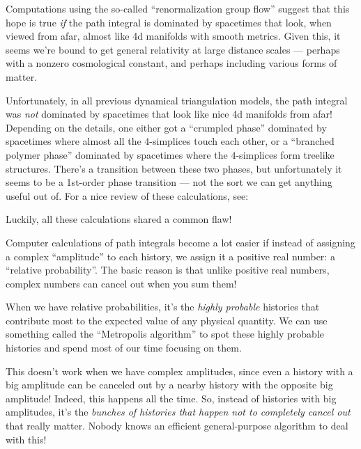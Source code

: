 \documentclass{article}
\def\tightlist{}
\renewcommand{\texttt}[1]{%
  \begingroup
  \ttfamily
  \begingroup\lccode`~=`/\lowercase{\endgroup\def~}{/\discretionary{}{}{}}%
  \begingroup\lccode`~=`[\lowercase{\endgroup\def~}{[\discretionary{}{}{}}%
  \begingroup\lccode`~=`.\lowercase{\endgroup\def~}{.\discretionary{}{}{}}%
  \catcode`/=\active\catcode`[=\active\catcode`.=\active
  \scantokens{#1\noexpand}%
  \endgroup
}
\begin{document}
Computations using the so-called ``renormalization group flow'' suggest
that this hope is true \emph{if} the path integral is dominated by
spacetimes that look, when viewed from afar, almost like 4d manifolds
with smooth metrics. Given this, it seems we're bound to get general
relativity at large distance scales --- perhaps with a nonzero
cosmological constant, and perhaps including various forms of matter.

Unfortunately, in all previous dynamical triangulation models, the path
integral was \emph{not} dominated by spacetimes that look like nice 4d
manifolds from afar! Depending on the details, one either got a
``crumpled phase'' dominated by spacetimes where almost all the
\(4\)-simplices touch each other, or a ``branched polymer phase''
dominated by spacetimes where the \(4\)-simplices form treelike
structures. There's a transition between these two phases, but
unfortunately it seems to be a 1st-order phase transition --- not the
sort we can get anything useful out of. For a nice review of these
calculations, see:


Luckily, all these calculations shared a common flaw!

Computer calculations of path integrals become a lot easier if instead
of assigning a complex ``amplitude'' to each history, we assign it a
positive real number: a ``relative probability''. The basic reason is
that unlike positive real numbers, complex numbers can cancel out when
you sum them!

When we have relative probabilities, it's the \emph{highly probable}
histories that contribute most to the expected value of any physical
quantity. We can use something called the ``Metropolis algorithm'' to
spot these highly probable histories and spend most of our time focusing
on them.

This doesn't work when we have complex amplitudes, since even a history
with a big amplitude can be canceled out by a nearby history with the
opposite big amplitude! Indeed, this happens all the time. So, instead
of histories with big amplitudes, it's the \emph{bunches of histories
that happen not to completely cancel out} that really matter. Nobody
knows an efficient general-purpose algorithm to deal with this!
\end{document}
